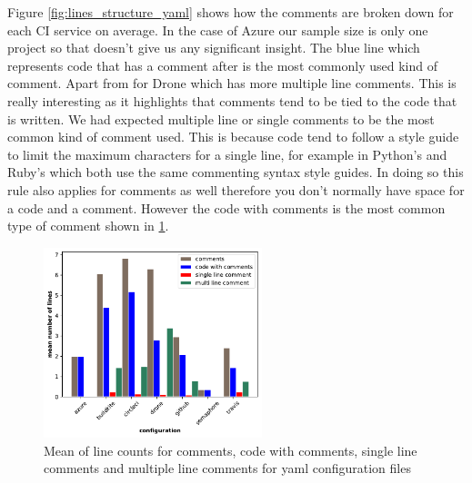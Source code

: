 \documentclass[10pt,conference]{IEEEtran}
\begin{document}
Figure \ref{fig:lines_structure_yaml} shows how the comments are broken down for each CI service on average. In the case of Azure our sample size is only one project so that doesn't give us any significant insight.
The blue line which represents code that has a comment after is the most commonly used kind of comment. Apart from for Drone which has more multiple line comments. This is really interesting as it highlights that comments tend to be tied to the code that is written. We had expected multiple line or single comments to be the most common kind of comment used. This is because code tend to follow a style guide to limit the maximum characters for a single line, for example in Python's \citet{PEP8} and Ruby's \citet{RUBY2020} which both use the same commenting syntax style guides. In doing so this rule also applies for comments as well therefore you don't normally have space for a code and a comment. However the code with comments is the most common type of comment shown in \ref{fig:lines_structure_yaml_comments}.

\begin{figure}[!ht]
  \centering
  \includegraphics[width=2.5in]{../src/results/line structure yaml comments.pdf}
  \caption[alt text]{Mean of line counts for comments, code with comments, single line comments and multiple line comments for yaml configuration files}
  \label{fig:lines_structure_yaml_comments}
\end{figure}
\end{document}
